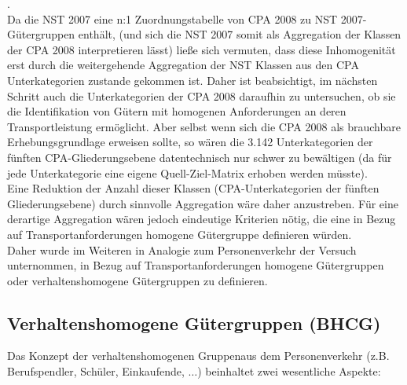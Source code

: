 .~\\
Da die NST 2007 eine n:1 Zuordnungstabelle von CPA 2008 zu NST 2007-Gütergruppen enthält, (und sich die NST 2007 somit als Aggregation der Klassen der CPA 2008 interpretieren lässt) ließe sich vermuten, dass diese Inhomogenität erst durch die weitergehende Aggregation der NST Klassen aus den CPA Unterkategorien zustande gekommen ist. Daher ist beabsichtigt, im nächsten Schritt auch die Unterkategorien der CPA 2008 daraufhin zu untersuchen, ob sie die Identifikation von Gütern mit homogenen Anforderungen an deren Transportleistung ermöglicht. Aber selbst wenn sich die CPA 2008 als brauchbare Erhebungsgrundlage erweisen sollte, so wären die 3.142 Unterkategorien der fünften CPA-Gliederungsebene datentechnisch nur schwer zu bewältigen (da für jede Unterkategorie eine eigene Quell-Ziel-Matrix erhoben werden müsste).~\\
Eine Reduktion der Anzahl dieser Klassen (CPA-Unterkategorien der fünften Gliederungsebene)  durch sinnvolle Aggregation wäre daher anzustreben. Für eine derartige Aggregation wären jedoch eindeutige Kriterien nötig, die eine in Bezug auf Transportanforderungen homogene Gütergruppe definieren würden.~\\
Daher wurde im Weiteren in Analogie zum Personenverkehr der Versuch unternommen, in Bezug auf Transportanforderungen homogene Gütergruppen oder verhaltenshomogene Gütergruppen zu definieren.~\\


% 
\subsection{Verhaltenshomogene Gütergruppen (BHCG)}
\label{_Toc366766108}
\label{_Toc366775302}
Das Konzept der \glqq verhaltenshomogenen Gruppen\grqq  aus dem Personenverkehr (z.B. Berufspendler, Schüler, Einkaufende, $\ldots$) beinhaltet zwei wesentliche Aspekte:~\\


